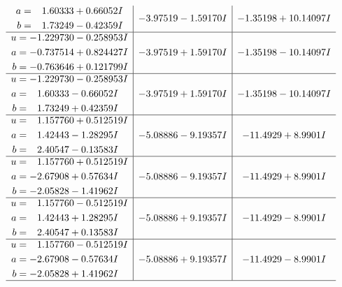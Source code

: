 \documentclass[1p]{elsarticle_modified}
\theoremstyle{definition}
\begin{document}
$$\begin{array}{c|c|c}
\begin{aligned}
a &= \phantom{-}1.60333 + 0.66052 I \\
b &= \phantom{-}1.73249 - 0.42359 I\end{aligned}
 & -3.97519 - 1.59170 I & -1.35198 + 10.14097 I \\ \hline\begin{aligned}
u &= -1.229730 - 0.258953 I \\
a &= -0.737514 + 0.824427 I \\
b &= -0.763646 + 0.121799 I\end{aligned}
 & -3.97519 + 1.59170 I & -1.35198 - 10.14097 I \\ \hline\begin{aligned}
u &= -1.229730 - 0.258953 I \\
a &= \phantom{-}1.60333 - 0.66052 I \\
b &= \phantom{-}1.73249 + 0.42359 I\end{aligned}
 & -3.97519 + 1.59170 I & -1.35198 - 10.14097 I \\ \hline\begin{aligned}
u &= \phantom{-}1.157760 + 0.512519 I \\
a &= \phantom{-}1.42443 - 1.28295 I \\
b &= \phantom{-}2.40547 - 0.13583 I\end{aligned}
 & -5.08886 - 9.19357 I & -11.4929 + 8.9901 I \\ \hline\begin{aligned}
u &= \phantom{-}1.157760 + 0.512519 I \\
a &= -2.67908 + 0.57634 I \\
b &= -2.05828 - 1.41962 I\end{aligned}
 & -5.08886 - 9.19357 I & -11.4929 + 8.9901 I \\ \hline\begin{aligned}
u &= \phantom{-}1.157760 - 0.512519 I \\
a &= \phantom{-}1.42443 + 1.28295 I \\
b &= \phantom{-}2.40547 + 0.13583 I\end{aligned}
 & -5.08886 + 9.19357 I & -11.4929 - 8.9901 I \\ \hline\begin{aligned}
u &= \phantom{-}1.157760 - 0.512519 I \\
a &= -2.67908 - 0.57634 I \\
b &= -2.05828 + 1.41962 I\end{aligned}
 & -5.08886 + 9.19357 I & -11.4929 - 8.9901 I\\
 \hline 
 \end{array}$$\newpage$$\begin{array}{c|c|c}  

\end{array}$$
\end{document}
